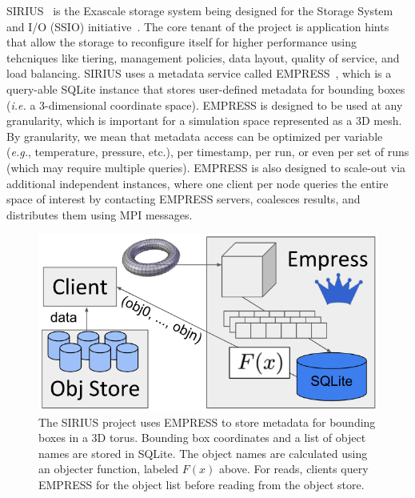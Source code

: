 SIRIUS~\cite{klasky:journal16-sirius} is the Exascale storage system being
designed for the Storage System and I/O (SSIO)
initiative~\cite{ross:report14-ssio}. The core tenant of the project is
application hints that allow the storage to reconfigure itself for higher
performance using tehcniques like tiering, management policies, data layout,
quality of service, and load balancing.  SIRIUS uses a metadata service called
EMPRESS~\cite{lawson:pdsw17-empress}, which is a query-able SQLite instance
that stores user-defined metadata for bounding boxes ({\it i.e.} a
3-dimensional coordinate space).  EMPRESS is designed to be used at any
granularity, which is important for a simulation space represented as a 3D
mesh. By granularity, we mean that metadata access can be optimized per
variable ({\it e.g.}, temperature, pressure, etc.), per timestamp, per run, or
even per set of runs (which may require multiple queries).  EMPRESS is also
designed to scale-out via additional independent instances, where one client
per node queries the entire space of interest by contacting EMPRESS servers,
coalesces results, and distributes them using MPI messages.


\begin{figure}[tb]
\centering
  \includegraphics[width=1\linewidth]{figures/empress.png}
  \caption{The SIRIUS project uses EMPRESS to store metadata for bounding boxes
in a 3D torus. Bounding box coordinates and a list of object names are stored
in SQLite. The object names are calculated using an objecter function, labeled
\(F(x)\) above. For reads, clients query EMPRESS for the object list before
reading from the object store.}
  \label{fig:empress}
\end{figure}

